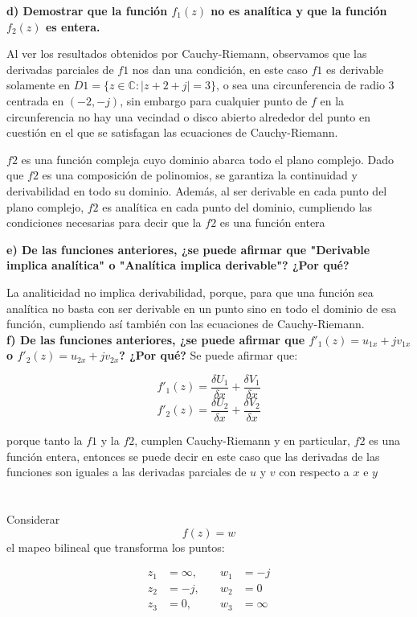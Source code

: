 \documentclass[12pt]{report}
\begin{document}
\textbf{d) Demostrar que la función $f_1(z)$ no es analítica y que la función $f_2(z)$ es entera.}

Al ver los resultados obtenidos por Cauchy-Riemann, observamos que las derivadas parciales de $f1$ nos dan una condición, en este caso $f1$ es derivable solamente
en $D1 = \{z \in \mathbb{C} : |z + 2 + j| = 3\}$, o sea una circunferencia de radio $3$ centrada en $(-2, -j)$, sin embargo para cualquier punto de $f$ en la
circunferencia no hay una vecindad o disco abierto alrededor del punto en cuestión en el que se satisfagan las ecuaciones de Cauchy-Riemann.

$f2$ es una función compleja cuyo dominio abarca todo el plano complejo. Dado que $f2$ es una composición de polinomios, se garantiza la continuidad y
derivabilidad en todo su dominio. Además, al ser derivable en cada punto del plano complejo, $f2$ es analítica en cada punto del dominio, cumpliendo las
condiciones necesarias para decir que la $f2$ es una función entera

\textbf{e) De las funciones anteriores, ¿se puede afirmar que "Derivable implica analítica" o "Analítica implica derivable"? ¿Por qué?}

La analiticidad no implica derivabilidad, porque, para que una función sea analítica no basta con ser derivable en un punto sino en todo el dominio de esa
función, cumpliendo así también con las ecuaciones de Cauchy-Riemann.\\

\textbf{f) De las funciones anteriores, ¿se puede afirmar que $f'_1(z) = u_{1x} + jv_{1x}$ o $f'_2(z) = u_{2x} + jv_{2x}$? ¿Por qué?}
Se puede afirmar que:

$$f'_1(z)=\frac{\delta U_1}{\delta x}+\frac{\delta V_1}{\delta x}$$
$$f'_2(z)=\frac{\delta U_2}{\delta x}+\frac{\delta V_2}{\delta x}$$

porque tanto la $f1$ y la $f2$, cumplen Cauchy-Riemann y en particular, $f2$ es una función entera, entonces se puede decir en este caso que las derivadas de las
funciones son iguales a las derivadas parciales de $u$ y $v$ con respecto a $x$ e $y$

\chapter{}

Considerar $$ f(z) = w $$ el mapeo bilineal que transforma los puntos:

\begin{align*}
    z_1 &= \infty, \quad & w_1 &= -j \\
    z_2 &= -j, \quad & w_2 &= 0 \\
    z_3 &= 0, \quad & w_3 &= \infty 
\end{align*}
\end{document}
